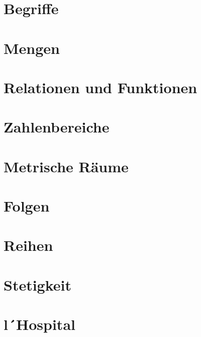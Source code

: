 \documentclass[final, 12pt]{article}
\begin{document}
  

\section{Begriffe}


\section{Mengen}


\section{Relationen und Funktionen}


\section{Zahlenbereiche}


\section{Metrische Räume}


\section{Folgen}


\section{Reihen}


\section{Stetigkeit}


\section{l´Hospital}



\newpage
\end{document}
